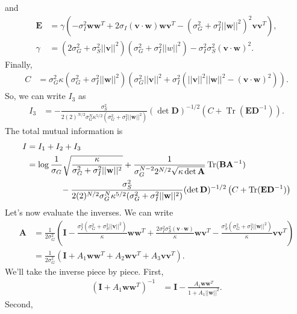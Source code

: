 \documentclass[11pt]{article}
\DeclareMathOperator{\Tr}{Tr}
\begin{document}
and
\begin{align}
	\mathbf{E} &= \gamma \left(-\sigma_I^2 \mathbf{ww}^T+ 2\sigma_I (\mathbf{v} \cdot \mathbf{w})\mathbf{wv}^T -(\sigma_G^2 + \sigma_I^2 ||\mathbf{w}||^2)^2 \mathbf{vv}^T\right),\\
	\gamma &= (2\sigma_G^2 + \sigma_S^2 ||\mathbf{v}||^2)(\sigma_G^2 + \sigma_I^2 ||w||^2) - \sigma_I^2 \sigma_S^2 (\mathbf{v}\cdot \mathbf{w})^2.
\end{align}
Finally,
\begin{align}
	C &= \sigma_G^2 \kappa (\sigma_G^2 + \sigma_I^2 ||\mathbf{w}||^2)(\sigma_G^2 ||\mathbf{v}||^2 + \sigma_I^2(||\mathbf{v}||^2 ||\mathbf{w}||^2 - (\mathbf{v}\cdot \mathbf{w})^2)).
\end{align}
So, we can write $I_3$ as 
\begin{align}
	I_3 &= -\frac{\sigma_S^2}{2(2)^{N/2} \sigma_G^N \kappa^{5/2} (\sigma_G^2 + \sigma_I^2 ||\mathbf{w}||^2)}(\det \mathbf{D})^{-1/2} \left(C + \Tr (\mathbf{E}\mathbf{D}^{-1})\right).
\end{align}
The total mutual information is
\begin{align}
	I &= I_1 + I_2 + I_3 \\
	&= \log \frac{1}{\sigma_G} \sqrt{\frac{\kappa}{\sigma_G^2 + \sigma_I^2 ||\mathbf{w}||^2}} +\frac{1}{\sigma_G^{N-2} 2^{N/2} \sqrt{\kappa \det \mathbf{A}}}\Tr(\mathbf{B} \mathbf{A}^{-1}) \notag \\
	&\qquad \qquad -\frac{\sigma_S^2}{2(2)^{N/2} \sigma_G^N \kappa^{5/2} (\sigma_G^2 + \sigma_I^2 ||\mathbf{w}||^2)}(\det \mathbf{D})^{-1/2} \left(C + \Tr (\mathbf{E}\mathbf{D}^{-1})\right)
\end{align}
Let's now evaluate the inverses. We can write 
\begin{align}
	\mathbf{A} &=  \frac{1}{2\sigma_G^2}\left(\mathbf{I} - \frac{\sigma_I^2(\sigma_G^2 +\sigma_S^2 ||\mathbf{v}||^2)}{\kappa} \mathbf{ww}^T+ \frac{2\sigma_I^2 \sigma_S^2 (\mathbf{v}\cdot \mathbf{w})}{ \kappa} \mathbf{wv}^T - \frac{\sigma_S^2 (\sigma_G^2 + \sigma_I^2 ||\mathbf{w}||^2)}{ \kappa} \mathbf{vv}^T\right)\\
	&= \frac{1}{2\sigma_G^2}(\mathbf{I} +A_1 \mathbf{ww}^T + A_2 \mathbf{wv}^T + A_3 \mathbf{vv}^T).
\end{align}
We'll take the inverse piece by piece. First, 
\begin{align}
	(\mathbf{I} + A_1 \mathbf{ww}^T)^{-1} &= \mathbf{I} - \frac{A_1 \mathbf{ww}^T}{1 + A_1 ||\mathbf{w}||^2}.
\end{align}
Second,
\end{document}
